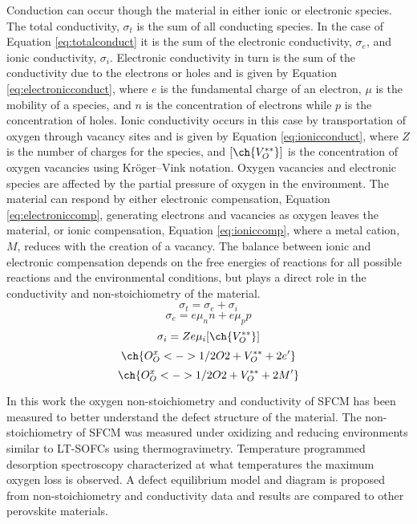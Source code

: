     Conduction can occur though the material in either ionic or electronic species.
    The total conductivity, $\sigma_t$ is the sum of all conducting species.
    In the case of Equation \ref{eq:totalconduct} it is the sum of the electronic conductivity, $\sigma_e$, and ionic conductivity, $\sigma_i$.
    Electronic conductivity in turn is the sum of the conductivity due to the electrons or holes and is given by Equation \ref{eq:electronicconduct}, where $e$ is the fundamental charge of an electron, $\mu$ is the mobility of a species, and $n$ is the concentration of electrons while $p$ is the concentration of holes.
    Ionic conductivity occurs in this case by transportation of oxygen through vacancy sites and is given by Equation \ref{eq:ionicconduct}, where $Z$ is the number of charges for the species, and $\lbrack\ch{V_O^{**}}\rbrack$ is the concentration of oxygen vacancies using Kr\"oger–Vink notation.
    Oxygen vacancies and electronic species are affected by the partial pressure of oxygen in the environment.
    The material can respond by either electronic compensation, Equation \ref{eq:electroniccomp}, generating electrons and vacancies as oxygen leaves the material, or ionic compensation, Equation \ref{eq:ioniccomp}, where a metal cation, $M$, reduces with the creation of a vacancy.
    The balance between ionic and electronic compensation depends on the free energies of reactions for all possible reactions and the environmental conditions, but plays a direct role in the conductivity and non-stoichiometry of the material.
    \begin{equation}
        \sigma_t=\sigma_e + \sigma_i
        \label{eq:totalconduct}
    \end{equation}
    \begin{equation}
        \sigma_e = e\mu_n{}n + e\mu_p{}p
        \label{eq:electronicconduct}
    \end{equation}
    \begin{equation}
        \sigma_i = Ze\mu_i\lbrack\ch{V_O^{**}}\rbrack
        \label{eq:ionicconduct}
    \end{equation}
    \begin{equation}
        \ch{O_O^x  <-> 1/2 O2 + V_O^{**} + 2 e'}
        \label{eq:electroniccomp}
    \end{equation}
    \begin{equation}
        \ch{O_O^x  <-> 1/2 O2 + V_O^{**} + 2 M'}
        \label{eq:ioniccomp}
    \end{equation}

    In this work the oxygen non-stoichiometry and conductivity of SFCM has been measured to better understand the defect structure of the material.
    The non-stoichiometry of SFCM was measured under oxidizing and reducing environments similar to LT-SOFCs using thermogravimetry.
    Temperature programmed desorption spectroscopy characterized at what temperatures the maximum oxygen loss is observed.
    A defect equilibrium model and diagram is proposed from non-stoichiometry and conductivity data and results are compared to other perovskite materials.


